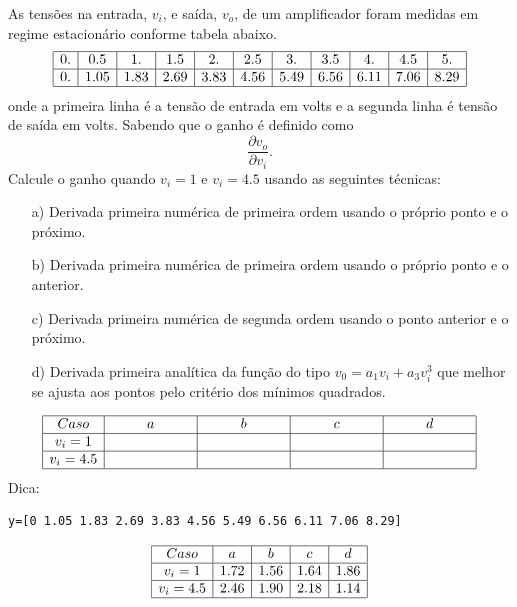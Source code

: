 \begin{Exercise} As tensões  na entrada, $v_i$, e saída, $v_o$, de um amplificador foram medidas em regime estacionário conforme tabela abaixo.
$$\begin{array}{|c|c|c|c|c|c|c|c|c|c|c|}
\hline
    0. &   0.5  &   1.   &   1.5  &   2. &     2.5   &  3.  &    3.5  &   4.  &    4.5  &   5.\\
 \hline
 0.  &  1.05  &  1.83  &  2.69  &  3.83 &   4.56 &   5.49 &   6.56  &  6.11 &   7.06  &  8.29\\
 \hline
\end{array}
$$
onde  a primeira linha é a tensão de entrada em volts e a segunda linha é tensão de saída em volts.
Sabendo que o ganho é definido como $$\frac{\partial v_o}{\partial v_i}.$$ Calcule o ganho quando $v_i=1$ e $v_i=4.5$ usando as seguintes técnicas:
\begin{itemize}
\item[a)] Derivada primeira numérica de primeira ordem usando o próprio ponto e o próximo.
\item[b)] Derivada primeira numérica de primeira ordem usando o próprio ponto e o anterior.
\item[c)] Derivada primeira numérica de segunda ordem usando o ponto anterior e o próximo.
\item[d)] Derivada primeira analítica da função do tipo $v_0=a_1 v_i + a_3 v_i^3$ que melhor se ajusta aos pontos pelo critério dos mínimos quadrados.
\end{itemize}
$$\begin{array}{|c|c|c|c|c|}
\hline
 Caso &  a  &   b &   c   &   d \\
 \hline
 v_i=1 &    & ~\hspace{50pt}~  &   & ~\hspace{50pt}~ \\
 \hline
v_i=4.5 &~\hspace{50pt}~    &   &  ~\hspace{50pt}~   &\\
 \hline
\end{array}
$$
\ifisscilab
Dica:
\begin{verbatim}
y=[0 1.05 1.83 2.69 3.83 4.56 5.49 6.56 6.11 7.06 8.29]
\end{verbatim}
\fi
\end{Exercise}
\begin{Answer}
  \begin{tiny}
$$\begin{array}{|c|c|c|c|c|}
\hline
 Caso &  a  &   b &   c   &   d \\
 \hline
 v_i=1 & 1.72   & 1.56  &  1.64 & 1.86 \\
 \hline
v_i=4.5 &2.46    & 1.90  &  2.18  &1.14  \\
 \hline
\end{array}
$$    
  \end{tiny}
\end{Answer}


